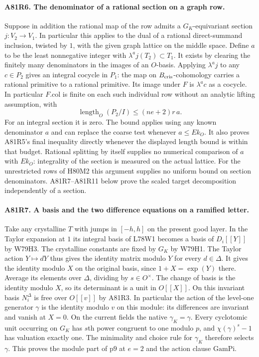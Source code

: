 \paragraph{A81R6. The denominator of a rational section on a graph row.}
Suppose in addition the rational map of the row admits a
$G_K$-equivariant section $j:V_2\to V_1$. In particular this
applies to the dual of a rational direct-summand inclusion,
twisted by $1$, with the given graph lattice on the middle space.
Define $a$ to be the least nonnegative integer with
$\lambda^a j(T_2)\subset T_1$. It exists by clearing the finitely
many denominators in the images of an $O$-basis. Applying
$\lambda^a j$ to any $c\in P_2$ gives an integral cocycle in
$P_1$: the map on $B_{\rm cris}$-cohomology carries a rational
primitive to a rational primitive. Its image under $F$ is
$\lambda^a c$ as a cocycle. In particular $F.\mathrm{col}$ is
finite on each such individual row without an analytic lifting
assumption, with
\[
 \operatorname{length}_O(P_2/I)\le (ne+2)r\,a .
\]
For an integral section it is zero. The bound applies using any
known denominator $a$ and can replace the coarse test whenever
$a\le E k_O$. It also proves A81R5's final inequality directly
whenever the displayed length bound is within that budget.
Rational splitting by itself supplies no numerical comparison of
$a$ with $E k_O$: integrality of the section is measured on the
actual lattice. For the unrestricted rows of H80M2 this argument supplies
no uniform bound on section denominators. A81R7--A81R11 below
prove the scaled target decomposition independently of a section.

\paragraph{A81R7. A basis and the two difference equations on a ramified letter.}
Take any crystalline $T$ with jumps in $[-h,h]$ on the present
good layer. In the Taylor expansion at $1$ its integral basis
of L78W1 becomes a basis of $D_i[[Y]]$ by W79H3. The crystalline
constants are fixed by $G_K$ by W79H1. The Taylor action
$Y\mapsto dY$ thus gives the identity matrix modulo $Y$ for
every $d\in\Delta$. It gives the identity modulo $X$ on the
original basis, since $1+X=\exp(Y)$ there. Average its elements
over $\Delta$, dividing by $s\in O^\times$. The change of basis is
the identity modulo $X$, so its determinant is a unit in $O[[X]]$.
On this invariant basis $N_i^\Delta$ is free over $O[[v]]$ by A81R3.
In particular the action of the level-one generator $\gamma$ is
the identity modulo $v$ on this module: its differences are
invariant and vanish at $X=0$. On the current fields the native
$\gamma_K=\gamma$. Every cyclotomic unit occurring on $G_K$ has
$s$th power congruent to one modulo $p$, and $\chi(\gamma)^s-1$
has valuation exactly one. The minimality and choice rule for
$\gamma_K$ therefore selects $\gamma$. This proves the module
part of $\mathrm{p9}$ at $e=2$ and the action clause
$\mathrm{GamPi}$.

